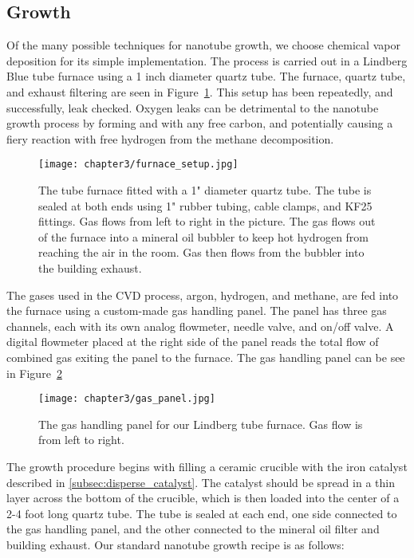\subsection{Growth}
\label{subsubsec:powder_cvd}

Of the many possible techniques for nanotube growth, we choose chemical vapor deposition for its simple implementation. The process is carried out in a Lindberg Blue tube furnace using a 1 inch diameter quartz tube. The furnace, quartz tube, and exhaust filtering are seen in Figure~\ref{fig:furnace_setup}. This setup has been repeatedly, and successfully, leak checked. Oxygen leaks can be detrimental to the nanotube growth process by forming  and  with any free carbon, and potentially causing a fiery reaction with free hydrogen from the methane decomposition.

\begin{figure}
    \centering
    \texttt{[image: chapter3/furnace\_setup.jpg]}
    \caption{The tube furnace fitted with a 1" diameter quartz tube. The tube is sealed at both ends using 1" rubber tubing, cable clamps, and KF25 fittings. Gas flows from left to right in the picture. The gas flows out of the furnace into a mineral oil bubbler to keep hot hydrogen from reaching the air in the room. Gas then flows from the bubbler into the building exhaust.}
    \label{fig:furnace_setup}
\end{figure}

The gases used in the CVD process, argon, hydrogen, and methane, are fed into the furnace using a custom-made gas handling panel. The panel has three gas channels, each with its own analog flowmeter, needle valve, and on/off valve. A digital flowmeter placed at the right side of the panel reads the total flow of combined gas exiting the panel to the furnace. The gas handling panel can be see in Figure~\ref{fig:gas_panel}

\begin{figure}
    \centering
    \texttt{[image: chapter3/gas\_panel.jpg]}
    \caption{The gas handling panel for our Lindberg tube furnace. Gas flow is from left to right.}
    \label{fig:gas_panel}
\end{figure}

The growth procedure begins with filling a ceramic crucible with the iron catalyst described in \ref{subsec:disperse_catalyst}. The catalyst should be spread in a thin layer across the bottom of the crucible, which is then loaded into the center of a 2-4 foot long quartz tube. The tube is sealed at each end, one side connected to the gas handling panel, and the other connected to the mineral oil filter and building exhaust. Our standard nanotube growth recipe is as follows: 

